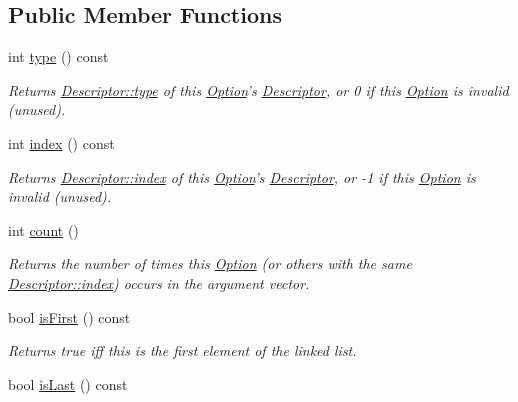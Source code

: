 \subsection*{Public Member Functions}
\begin{DoxyCompactItemize}
\item 
int \hyperlink{class_option_parser_1_1_option_a957a9dab42de6de017ee655254b57a41}{type} () const 
\begin{DoxyCompactList}\small\item\em Returns \hyperlink{struct_option_parser_1_1_descriptor_a070d24a33fc9f30cf3deafa428ff7fa7}{Descriptor\-::type} of this \hyperlink{class_option_parser_1_1_option}{Option}'s \hyperlink{struct_option_parser_1_1_descriptor}{Descriptor}, or 0 if this \hyperlink{class_option_parser_1_1_option}{Option} is invalid (unused). \end{DoxyCompactList}\item 
int \hyperlink{class_option_parser_1_1_option_aaa10d0593f60d8cd2c631fe99b26cf0a}{index} () const 
\begin{DoxyCompactList}\small\item\em Returns \hyperlink{struct_option_parser_1_1_descriptor_ae62860781844b44c0bd4f730c96701d7}{Descriptor\-::index} of this \hyperlink{class_option_parser_1_1_option}{Option}'s \hyperlink{struct_option_parser_1_1_descriptor}{Descriptor}, or -\/1 if this \hyperlink{class_option_parser_1_1_option}{Option} is invalid (unused). \end{DoxyCompactList}\item 
int \hyperlink{class_option_parser_1_1_option_a43b8ad4e4546d97bd12ed04ea39850e2}{count} ()
\begin{DoxyCompactList}\small\item\em Returns the number of times this \hyperlink{class_option_parser_1_1_option}{Option} (or others with the same \hyperlink{struct_option_parser_1_1_descriptor_ae62860781844b44c0bd4f730c96701d7}{Descriptor\-::index}) occurs in the argument vector. \end{DoxyCompactList}\item 
bool \hyperlink{class_option_parser_1_1_option_aca0c27907db0b24c320252ea80babf6d}{is\-First} () const 
\begin{DoxyCompactList}\small\item\em Returns true iff this is the first element of the linked list. \end{DoxyCompactList}\item 
bool \hyperlink{class_option_parser_1_1_option_ad901abe9af59167b9c2b1937b7129fdc}{is\-Last} () const 

\end{DoxyCompactItemize}
